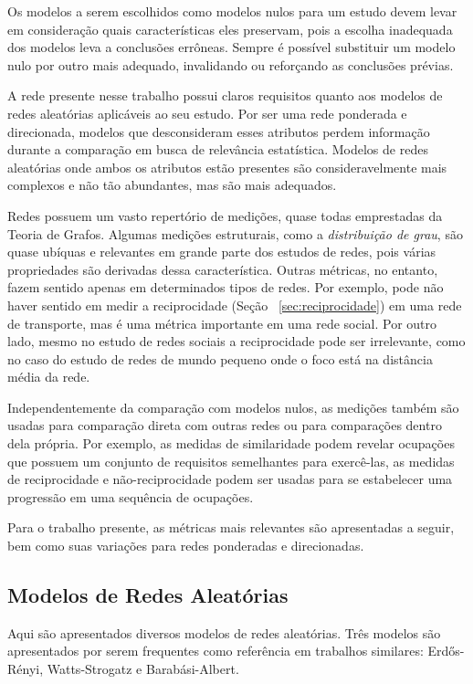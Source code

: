 \documentclass[12pt,a4paper]{article}
\theoremstyle{hypo}
\begin{document}
Os modelos a serem escolhidos como modelos nulos para um estudo devem levar em consideração quais características eles preservam, pois a escolha inadequada dos modelos leva a conclusões errôneas. Sempre é possível substituir um modelo nulo por outro mais adequado, invalidando ou reforçando as conclusões prévias.

A rede presente nesse trabalho possui claros requisitos quanto aos modelos de redes aleatórias aplicáveis ao seu estudo. Por ser uma rede ponderada e direcionada, modelos que desconsideram esses atributos perdem informação durante a comparação em busca de relevância estatística. Modelos de redes aleatórias onde ambos os atributos estão presentes são consideravelmente mais complexos e não tão abundantes, mas são mais adequados.

Redes possuem um vasto repertório de medições, quase todas emprestadas da Teoria de Grafos. Algumas medições estruturais, como a \textit{distribuição de grau}, são quase ubíquas e relevantes em grande parte dos estudos de redes, pois várias propriedades são derivadas dessa característica. Outras métricas, no entanto, fazem sentido apenas em determinados tipos de redes. Por exemplo, pode não haver sentido em medir a reciprocidade (Seção ~\ref{sec:reciprocidade}) em uma rede de transporte, mas é uma métrica importante em uma rede social. Por outro lado, mesmo no estudo de redes sociais a reciprocidade pode ser irrelevante, como no caso do estudo de redes de mundo pequeno onde o foco está na distância média da rede.

Independentemente da comparação com modelos nulos, as medições também são usadas para comparação direta com outras redes ou para comparações dentro dela própria. Por exemplo, as medidas de similaridade podem revelar ocupações que possuem um conjunto de requisitos semelhantes para exercê-las, as medidas de reciprocidade e não-reciprocidade podem ser usadas para se estabelecer uma progressão em uma sequência de ocupações.

Para o trabalho presente, as métricas mais relevantes são apresentadas a seguir, bem como suas variações para redes ponderadas e direcionadas.

\subsection{Modelos de Redes Aleatórias}

Aqui são apresentados diversos modelos de redes aleatórias. Três modelos são apresentados por serem frequentes como referência em trabalhos similares: Erdős-Rényi, Watts-Strogatz e Barabási-Albert.
\end{document}
